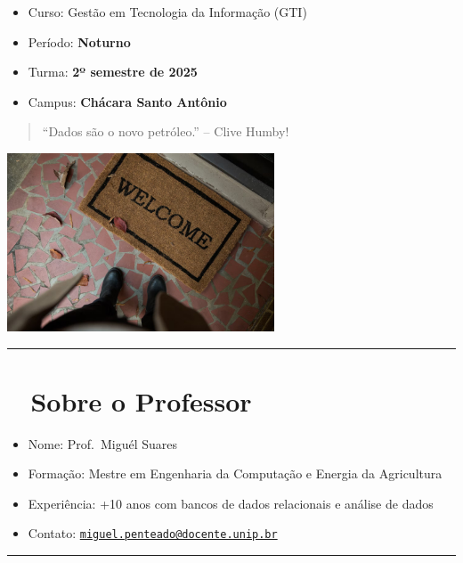 \documentclass[
]{book}
\providecommand{\tightlist}{%
  \setlength{\itemsep}{0pt}\setlength{\parskip}{0pt}}
\begin{document}
\begin{itemize}
\tightlist
\item
  Curso: Gestão em Tecnologia da Informação (GTI)\\
\item
  Período: \textbf{Noturno}\\
\item
  Turma: \textbf{2º semestre de 2025}
\item
  Campus: \textbf{Chácara Santo Antônio}
\end{itemize}

\begin{quote}
``Dados são o novo petróleo.'' -- Clive Humby!
\end{quote}

\includegraphics[width=3.125in,height=\textheight]{images/2025-08-04/Boas_Vindas.jpg}

\begin{center}\rule{0.5\linewidth}{0.5pt}\end{center}

\section{👨‍🏫 Sobre o Professor}\label{sobre-o-professor}

\begin{itemize}
\item
  Nome: Prof.~Miguél Suares
\item
  Formação: Mestre em Engenharia da Computação e Energia da Agricultura
\item
  Experiência: +10 anos com bancos de dados relacionais e análise de dados
\item
  Contato: \href{mailto:miguel.penteado@docente.unip.br}{\nolinkurl{miguel.penteado@docente.unip.br}}
\end{itemize}

\begin{center}\rule{0.5\linewidth}{0.5pt}\end{center}
\end{document}
